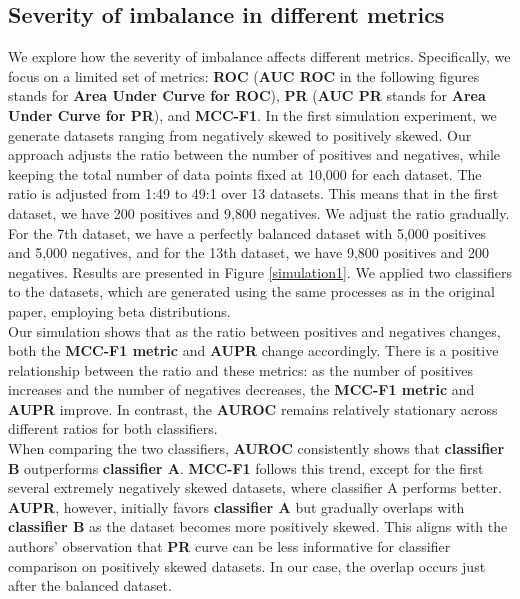 \documentclass[12pt, oneside]{amsart}
\theoremstyle{definition}
\theoremstyle{remark}
\numberwithin{equation}{section}
\begin{document}
\subsection{Severity of imbalance in different metrics}
We explore how the severity of imbalance affects different metrics. Specifically, we focus on a limited set of metrics: \textbf{ROC} (\textbf{AUC ROC} in the following figures stands for \textbf{Area Under Curve for ROC}), \textbf{PR} (\textbf{AUC PR} stands for \textbf{Area Under Curve for PR}), and \textbf{MCC-F1}. In the first simulation experiment, we generate datasets ranging from negatively skewed to positively skewed. Our approach adjusts the ratio between the number of positives and negatives, while keeping the total number of data points fixed at 10,000 for each dataset. The ratio is adjusted from 1:49 to 49:1 over 13 datasets. This means that in the first dataset, we have 200 positives and 9,800 negatives. We adjust the ratio gradually. For the 7th dataset, we have a perfectly balanced dataset with 5,000 positives and 5,000 negatives, and for the 13th dataset, we have 9,800 positives and 200 negatives. Results are presented in Figure \ref{simulation1}. We applied two classifiers to the datasets, which are generated using the same processes as in the original paper, employing beta distributions. \\


Our simulation shows that as the ratio between positives and negatives changes, both the \textbf{MCC-F1 metric} and \textbf{AUPR} change accordingly. There is a positive relationship between the ratio and these metrics: as the number of positives increases and the number of negatives decreases, the \textbf{MCC-F1 metric} and \textbf{AUPR} improve. In contrast, the \textbf{AUROC} remains relatively stationary across different ratios for both classifiers.\\

When comparing the two classifiers, \textbf{AUROC} consistently shows that \textbf{classifier B} outperforms \textbf{classifier A}. \textbf{MCC-F1} follows this trend, except for the first several extremely negatively skewed datasets, where classifier A performs better. \textbf{AUPR}, however, initially favors \textbf{classifier A} but gradually overlaps with \textbf{classifier B} as the dataset becomes more positively skewed. This aligns with the authors' observation that \textbf{PR} curve can be less informative for classifier comparison on positively skewed datasets. In our case, the overlap occurs just after the balanced dataset.\\
\end{document}
